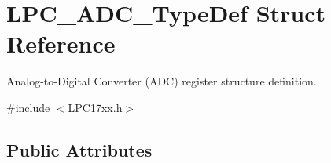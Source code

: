 \hypertarget{struct_l_p_c___a_d_c___type_def}{\section{\-L\-P\-C\-\_\-\-A\-D\-C\-\_\-\-Type\-Def \-Struct \-Reference}
\label{struct_l_p_c___a_d_c___type_def}
}


\-Analog-\/to-\/\-Digital \-Converter (\-A\-D\-C) register structure definition.  




{\ttfamily \#include $<$\-L\-P\-C17xx.\-h$>$}

\subsection*{\-Public \-Attributes}
